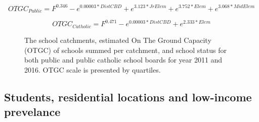 \documentclass[
default
]{sn-jnl}
\begin{document}
\begin{equation}
\label{eq:OTGC-public}
OTGC_{Public} = F^{0.346}-e^{0.00003*DistCBD}+e^{3.123*JrElem}+e^{3.752*Elem}+ e^{3.068*MidElem} 
\end{equation}

\begin{equation}
\label{eq:OTGC-catholic}
OTGC_{Catholic} =F^{0.471}-e^{0.00003*DistCBD}+e^{2.333*Elem}
\end{equation}

\begin{figure}


\caption{\label{fig-Fig1}The school catchments, estimated On The Ground
Capacity (OTGC) of schools summed per catchment, and school status for
both public and public catholic school boards for year 2011 and 2016.
OTGC scale is presented by quartiles.}

\end{figure}%

\subsection{Students, residential locations and low-income
prevelance}\label{students-residential-locations-and-low-income-prevelance}
\end{document}
